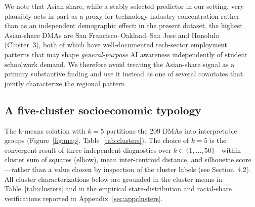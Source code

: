 \documentclass[11pt]{article}
\begin{document}
We note that Asian share, while a stably selected predictor in our setting, very plausibly acts in part as a proxy for technology-industry concentration rather than as an independent demographic effect: in the present dataset, the highest Asian-share DMAs are San Francisco--Oakland--San Jose and Honolulu (Cluster~3), both of which have well-documented tech-sector employment patterns that may shape \emph{general-purpose} AI awareness independently of student schoolwork demand. We therefore avoid treating the Asian-share signal as a primary substantive finding and use it instead as one of several covariates that jointly characterize the regional pattern.

\subsection{A five-cluster socioeconomic typology}

The k-means solution with $k=5$ partitions the 209 DMAs into interpretable groups (Figure~\ref{fig:map}, Table~\ref{tab:clusters}). The choice of $k=5$ is the convergent result of three independent diagnostics over $k \in \{1, \ldots, 50\}$---within-cluster sum of squares (elbow), mean inter-centroid distance, and silhouette score---rather than a value chosen by inspection of the cluster labels (see Section~4.2). All cluster characterizations below are grounded in the cluster means in Table~\ref{tab:clusters} and in the empirical state-distribution and racial-share verifications reported in Appendix~\ref{sec:appclusters}.
\end{document}
